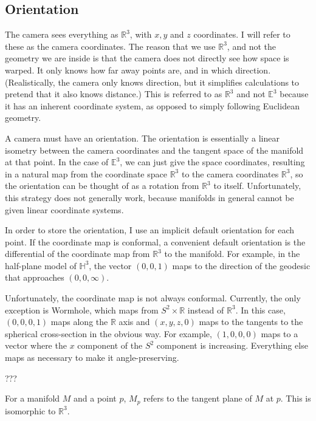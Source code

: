 \subsection{Orientation}


The camera sees everything as $\mathbb{R}^3$, with $x,y$ and $z$ coordinates. I will refer to these as the camera coordinates. The reason that we use $\mathbb{R}^3$, and not the geometry we are inside is that the camera does not directly see how space is warped. It only knows how far away points are, and in which direction. (Realistically, the camera only knows direction, but it simplifies calculations to pretend that it also knows distance.) This is referred to as $\mathbb{R}^3$ and not $\mathbb{E}^3$ because it has an inherent coordinate system, as opposed to simply following Euclidean geometry.

A camera must have an orientation. The orientation is essentially a linear isometry between the camera coordinates and the tangent space of the manifold at that point. In the case of $\mathbb{E}^3$, we can just give the space coordinates, resulting in a natural map from the coordinate space $\mathbb{R}^3$ to the camera coordinates $\mathbb{R}^3$, so the orientation can be thought of as a rotation from $\mathbb{R}^3$ to itself. Unfortunately, this strategy does not generally work, because manifolds in general cannot be given linear coordinate systems.

In order to store the orientation, I use an implicit default orientation for each point. If the coordinate map is conformal, a convenient default orientation is the differential of the coordinate map from $\mathbb{R}^3$ to the manifold. For example, in the half-plane model of $\mathbb{H}^3$, the vector $(0,0,1)$ maps to the direction of the geodesic that approaches $(0,0,\infty)$.

Unfortunately, the coordinate map is not always conformal. Currently, the only exception is Wormhole, which maps from $S^2 \times \mathbb{R}$ instead of $\mathbb{R}^3$. In this case, $(0,0,0,1)$ maps along the $\mathbb{R}$ axis and $(x,y,z,0)$ maps to the tangents to the spherical cross-section in the obvious way. For example, $(1,0,0,0)$ maps to a vector where the $x$ component of the $S^2$ component is increasing. Everything else maps as necessary to make it angle-preserving.

???

For a manifold $M$ and a point $p$, $M_p$ refers to the tangent plane of $M$ at $p$. This is isomorphic to $\mathbb{R}^3$.

